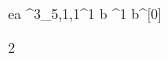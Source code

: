 \begin{eqcode}{e}{a }{^3_{5,1,1}}{^1}
  b \in {}^1 \lend
  b^{[0]} \gets \begin{tmatrix} 2  \lend \end{tmatrix} \lend
   \lend
\end{eqcode}

